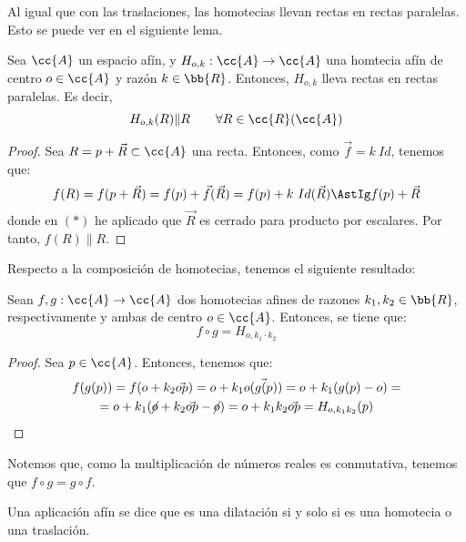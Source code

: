 Al igual que con las traslaciones, las homotecias llevan rectas en rectas paralelas. Esto se puede ver en el siguiente lema.
\begin{lema}
    Sea $\cc{A}$ un espacio afín, y $H_{o,k}:\cc{A}\to \cc{A}$ una homtecia afín de centro $o\in \cc{A}$ y razón $k\in \bb{R}$. Entonces, $H_{o,k}$ lleva rectas en rectas paralelas. Es decir,
    \begin{equation*}
        H_{o,k}(R)\| R \qquad \forall R\in \cc{R}(\cc{A})
    \end{equation*}
\end{lema}
\begin{proof}
    Sea $R=p+\vec{R}\subset \cc{A}$ una recta. Entonces, como $\vec{f}=k~Id$, tenemos que:
    \begin{equation*}
        f(R) = f(p+\vec{R}) = f(p) + \vec{f}(\vec{R}) = f(p) + k~Id(\vec{R}) \AstIg f(p) + \vec{R}
    \end{equation*}
    donde en $(\ast)$ he aplicado que $\vec{R}$ es cerrado para producto por escalares. Por tanto, $f(R)\| R$.
\end{proof}

Respecto a la composición de homotecias, tenemos el siguiente resultado:
\begin{lema}
    Sean $f,g:\cc{A}\to \cc{A}$ dos homotecias afines de razones $k_1,k_2\in \bb{R}$, respectivamente y ambas de centro $o\in \cc{A}$. Entonces, se tiene que:
    \begin{equation*}
        f\circ g = H_{o,k_1\cdot k_2}
    \end{equation*}
\end{lema}
\begin{proof}
    Sea $p\in \cc{A}$. Entonces, tenemos que:
    \begin{multline*}
        f(g(p)) = f(o+k_2\vec{op}) = o+k_1\vec{o(g(p))} = o + k_1(g(p)-o) =\\= o + k_1(\cancel{o}+k_2\vec{op}-\cancel{o}) = o + k_1k_2\vec{op} = H_{o,k_1k_2}(p) \qedhere
    \end{multline*}
\end{proof}
Notemos que, como la multiplicación de números reales es conmutativa, tenemos que $f\circ g = g\circ f$.


\begin{definicion}
    Una aplicación afín se dice que es una dilatación si y solo si es una homotecia o una traslación.
\end{definicion}

